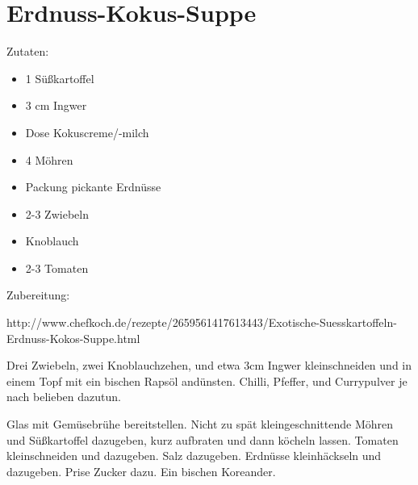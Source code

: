 \section{Erdnuss-Kokus-Suppe}

Zutaten:

\begin{itemize}
    \item 1 Süßkartoffel
	\item 3 cm Ingwer
	\item Dose Kokuscreme/-milch
	\item 4 Möhren
	\item Packung pickante Erdnüsse
	\item 2-3 Zwiebeln
	\item Knoblauch
	\item 2-3 Tomaten
\end{itemize}

\noindent Zubereitung:

http://www.chefkoch.de/rezepte/2659561417613443/Exotische-Suesskartoffeln-Erdnuss-Kokos-Suppe.html

Drei Zwiebeln, zwei Knoblauchzehen, und etwa 3cm Ingwer kleinschneiden und in
einem Topf mit ein bischen Rapsöl andünsten. Chilli, Pfeffer, und Currypulver
je nach belieben dazutun.

Glas mit Gemüsebrühe bereitstellen. Nicht zu spät kleingeschnittende Möhren und
Süßkartoffel dazugeben, kurz aufbraten und dann köcheln lassen. Tomaten
kleinschneiden und dazugeben. Salz dazugeben.  Erdnüsse kleinhäckseln und
dazugeben. Prise Zucker dazu. Ein bischen Koreander.	 

\newpage
\mbox{}
\vfill
\begin{center}
\end{center}
\vfill
\mbox{ }
\newpage
